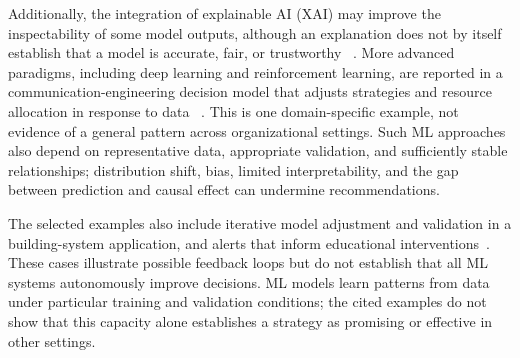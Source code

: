 \documentclass{sfuthesis}
\begin{document}
Additionally, the integration of explainable AI (XAI) may improve the inspectability of some model outputs, although an explanation does not by itself establish that a model is accurate, fair, or trustworthy ~\cite{leem2023towards}. More advanced paradigms, including deep learning and reinforcement learning, are reported in a communication-engineering decision model that adjusts strategies and resource allocation in response to data ~\cite{miao2025research}. This is one domain-specific example, not evidence of a general pattern across organizational settings. Such ML approaches also depend on representative data, appropriate validation, and sufficiently stable relationships; distribution shift, bias, limited interpretability, and the gap between prediction and causal effect can undermine recommendations.\par
The selected examples also include iterative model adjustment and validation in a building-system application, and alerts that inform educational interventions~\cite{song2024building}. These cases illustrate possible feedback loops but do not establish that all ML systems autonomously improve decisions. ML models learn patterns from data under particular training and validation conditions; the cited examples do not show that this capacity alone establishes a strategy as promising or effective in other settings.
\end{document}
